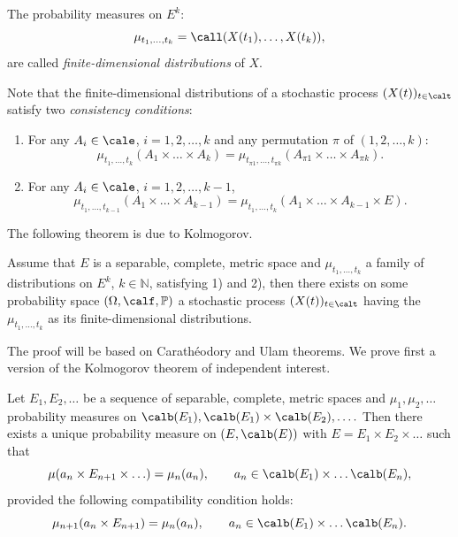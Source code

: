 \documentclass[preprint]{imsart}
\def\P{\mathbb P}
\def\N{\mathbb N}
\begin{document}
{The probability
measures on $E^k$:
$$
\mu_{t_1,\ldots,t_k} = \call (X(t_1),\ldots,X(t_k)),
$$
are called {\em finite-dimensional distributions} of
$X$.

Note that the finite-dimensional distributions of a
stochastic process $(X(t))_{t\in\calt}$ satisfy two
{\em consistency conditions}:
\begin{enumerate}
  \item[1)] For any $A_i\in\cale$, $i=1,2,\ldots,k$
  and any permutation $\pi$ of $(1,2,\ldots,k)$:
  $$
  \mu_{t_1,\ldots,t_k}(A_1\times \ldots
  \times A_k) =
   \mu_{t_{\pi 1},\ldots,t_{\pi k}}(A_{\pi 1}\times
   \ldots\times A_{\pi k}).
   $$

  \item[2)] For any $A_i\in\cale$, $i=1,2,\ldots,k-1$,
   $$
  \mu_{t_1,\ldots,t_{k-1}}(A_1\times \ldots
  \times A_{k-1}) =
  \mu_{t_1,\ldots,t_k}(A_1\times\ldots
  \times A_{k-1}\times E).
  $$
\end{enumerate}
The following theorem is due to Kolmogorov.

\begin{Theorem}
  Assume that $E$ is a separable, complete, metric space and
  $\mu_{t_1,\ldots,t_k}$ a family of distributions on
  $E^k$, $k\in \N$, satisfying 1) and 2), then there exists
  on some probability space $(\Omega,\calf,\P)$ a
  stochastic process $(X(t))_{t\in\calt}$ having the
  $\mu_{t_1,\ldots,t_k}$ as its finite-dimensional
  distributions.
\end{Theorem}
The proof will be based on Carath\'eodory and Ulam theorems.
We prove first a version of the Kolmogorov theorem of independent interest.


\begin{Proposition}\label{prekolmogorov}
  Let $E_1,E_2,\ldots$ be a sequence of separable,
  complete, metric spaces and $\mu_1,\mu_2,\ldots$
  probability measures on $\calb(E_1), \calb(E_1)
  \times \calb(E_2),\ldots.$ Then there exists a
  unique probability measure on $(E,\calb (E))$ with
  $E= E_1\times E_2\times\ldots$ such that
  $$
  \mu (a_n\times E_{n+1}\times\ldots)
  =\mu_n(a_n),
  \qquad a_n\in \calb(E_1)
  \times \ldots\calb(E_n),
  $$
  provided the following compatibility condition holds:
  $$
  \mu_{n+1}(a_n\times E_{n+1})
  =
  \mu_n(a_n), \qquad a_n\in \calb(E_1)
  \times \ldots\calb(E_n).
  $$
\end{Proposition}

}
\end{document}
